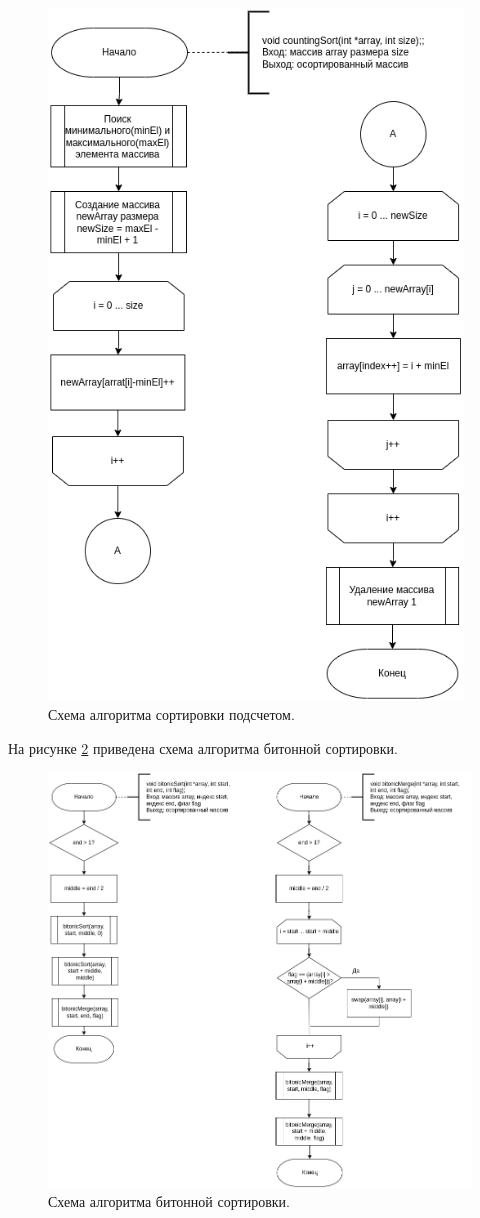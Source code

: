 \begin{figure}[h]
	\centering
	\includegraphics[width=110mm]{images/counting}
	\caption{Схема алгоритма сортировки подсчетом.}
	\label{img:counting}
\end{figure}

\newpage
На рисунке \ref{img:bitonic} приведена схема алгоритма битонной сортировки.
\begin{figure}[h]
	\centering
	\includegraphics[width=175mm]{images/bitonic}
	\caption{Схема алгоритма битонной сортировки.}
	\label{img:bitonic}
\end{figure}

